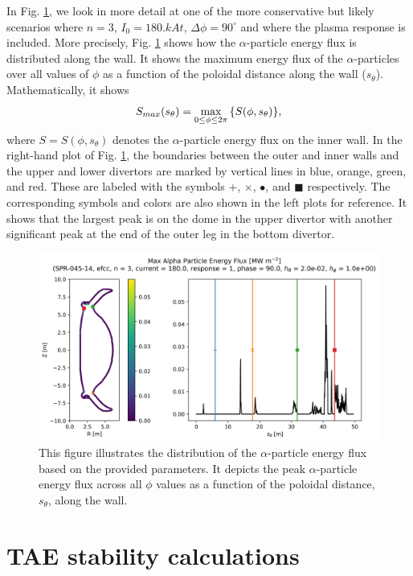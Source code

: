 \documentclass[10pt, a4paper, twoside]{article}
\begin{document}
In Fig. \ref{fig:energy_flux_distribution}, we look in more detail at one of the more conservative but likely scenarios where $n=3$, $I_0= 180\si{.kAt}$, $\Delta \phi = 90^\circ$ and where the plasma response is included. More precisely, Fig. \ref{fig:energy_flux_distribution} shows how the $\alpha$-particle energy flux is distributed along the wall. It shows the maximum energy flux of the $\alpha$-particles over all values of $\phi$ as a function of the poloidal distance along the wall ($s_\theta$). Mathematically, it shows
\begin{equation}
    S_{max}(s_\theta) = \max_{0\le \phi \le 2\pi}\qty{S(\phi, s_\theta)},
\end{equation}
where $S=S(\phi, s_\theta)$ denotes the $\alpha$-particle energy flux on the inner wall.
In the right-hand plot of Fig. \ref{fig:energy_flux_distribution}, the boundaries between the outer and inner walls and the upper and lower divertors are marked by vertical lines in blue, orange, green, and red. These are labeled with the symbols +, $\times$, $\bullet$, and $\blacksquare$ respectively. The corresponding symbols and colors are also shown in the left plots for reference.  It shows that the largest peak is on the dome in the upper divertor with another significant peak at the end of the outer leg in the bottom divertor.

\begin{figure}[!htb]
    \centering
    \includegraphics[width=0.7\linewidth]{Figures/simple_line_plot_no_confidence_band.png}
    \caption{This figure illustrates the distribution of the $\alpha$-particle energy flux based on the provided parameters. It depicts the peak $\alpha$-particle energy flux across all $\phi$ values as a function of the poloidal distance, $s_\theta$, along the wall.}
    \label{fig:energy_flux_distribution}
\end{figure}

\section{TAE stability calculations}
\label{sec:halo_work}
\end{document}

